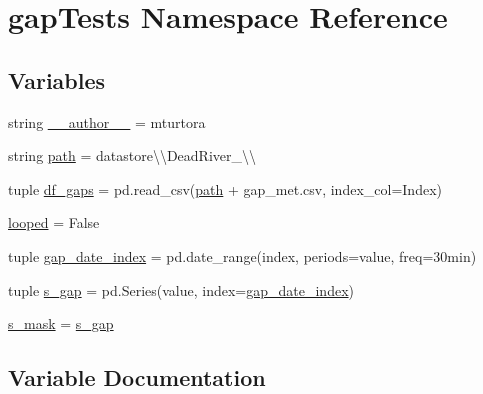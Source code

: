 \hypertarget{namespacegap_tests}{}\section{gap\+Tests Namespace Reference}
\label{namespacegap_tests}
\subsection*{Variables}
\begin{DoxyCompactItemize}
\item 
string \hyperlink{namespacegap_tests_a7601773bbec9b1e705d8dcacec0cecd4}{\+\_\+\+\_\+author\+\_\+\+\_\+} = \textquotesingle{}mturtora\textquotesingle{}
\item 
string \hyperlink{namespacegap_tests_a3f57b56fc8e69d0dcd827c75f6743077}{path} = \textquotesingle{}datastore\textbackslash{}\textbackslash{}\+Dead\+River\+\_\textbackslash{}\textbackslash{}\textquotesingle{}
\item 
tuple \hyperlink{namespacegap_tests_ad25db032c69bfc31e323da6fb64c808d}{df\+\_\+gaps} = pd.\+read\+\_\+csv(\hyperlink{namespacegap_tests_a3f57b56fc8e69d0dcd827c75f6743077}{path} + \textquotesingle{}gap\+\_\+met.\+csv\textquotesingle{}, index\+\_\+col=\textquotesingle{}Index\textquotesingle{})
\item 
\hyperlink{namespacegap_tests_aea36505be1591db057e57303d8fe98cf}{looped} = False
\item 
tuple \hyperlink{namespacegap_tests_aaf8a186769b9c7f206ec21bc0c710dfc}{gap\+\_\+date\+\_\+index} = pd.\+date\+\_\+range(index, periods=value, freq=\textquotesingle{}30min\textquotesingle{})
\item 
tuple \hyperlink{namespacegap_tests_a350ecaddda824acaaadc5c9162516906}{s\+\_\+gap} = pd.\+Series(value, index=\hyperlink{namespacegap_tests_aaf8a186769b9c7f206ec21bc0c710dfc}{gap\+\_\+date\+\_\+index})
\item 
\hyperlink{namespacegap_tests_ab33889c225b00a0897051f8b89d74acd}{s\+\_\+mask} = \hyperlink{namespacegap_tests_a350ecaddda824acaaadc5c9162516906}{s\+\_\+gap}
\end{DoxyCompactItemize}


\subsection{Variable Documentation}
\hypertarget{namespacegap_tests_a7601773bbec9b1e705d8dcacec0cecd4}{}
